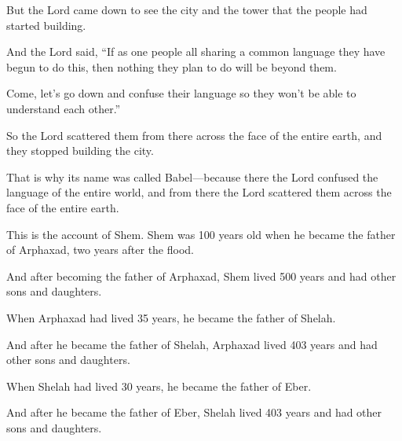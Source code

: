 \begin{scripture}
 But the Lord came down to see the city and the tower that the people had started building.
 And the Lord said, ``If as one people all sharing a common language they have begun to do this, then nothing they plan to do will be beyond them.
 Come, let's go down and confuse their language so they won't be able to understand each other.''
\everypar{}

 So the Lord scattered them from there across the face of the entire earth, and they stopped building the city.
 That is why its name was called Babel---because there the Lord confused the language of the entire world, and from there the Lord scattered them across the face of the entire earth.
\everypar{}

 This is the account of Shem. Shem was 100 years old when he became the father of Arphaxad, two years after the flood.
 And after becoming the father of Arphaxad, Shem lived 500 years and had other sons and daughters.
\everypar{}

 When Arphaxad had lived 35 years, he became the father of Shelah.
 And after he became the father of Shelah, Arphaxad lived 403 years and had other sons and daughters.
\everypar{}

 When Shelah had lived 30 years, he became the father of Eber.
 And after he became the father of Eber, Shelah lived 403 years and had other sons and daughters.
\everypar{}


\end{scripture}
